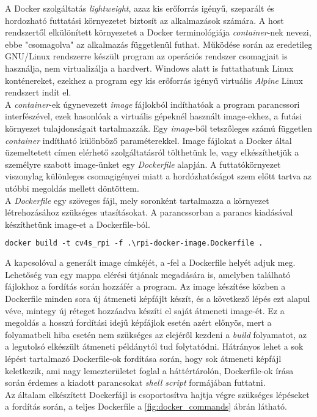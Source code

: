 A Docker szolgáltatás \emph{lightweight}, azaz kis erőforrás igényű, szeparált és hordozható futtatási környezetet biztosít az alkalmazások számára. A host rendszertől elkülönített környezetet a Docker terminológiája \emph{container}-nek nevezi, ebbe "csomagolva" az alkalmazás függetlenül futhat. Működése során az eredetileg GNU/Linux rendszerre készült program az operációs rendszer csomagjait is használja, nem virtualizálja a hardvert. Windows alatt is futtathatunk Linux konténereket, ezekhez a program egy kis erőforrás igényű virtuális \emph{Alpine} Linux rendszert indít el. 
\\
 A \emph{container}-ek úgynevezett \emph{image} fájlokból indíthatóak a program parancssori interfészével, ezek hasonlóak a virtuális gépeknél használt image-ekhez, a futási környezet tulajdonságait tartalmazzák. Egy \emph{image}-ből tetszőleges számú független \emph{container} indítható különböző paraméterekkel. Image fájlokat a Docker által üzemeltetett  címen elérhető szolgáltatásról tölthetünk le, vagy elkészíthetjük a személyre szabott image-ünket egy \emph{Dockerfile} alapján. A futtatókörnyezet viszonylag különleges csomagigényei miatt a hordózhatóságot szem előtt tartva az utóbbi megoldás mellett döntöttem.\\
A \emph{Dockerfile} egy szöveges fájl, mely soronként tartalmazza a környezet létrehozásához szükséges utasításokat. A parancssorban a  parancs kiadásával készíthetünk image-et a Dockerfile-ból.

\begin{mdframed}[backgroundcolor=gray!20]
\begin{small}
\begin{lstlisting}[language=XML]
docker build -t cv4s_rpi -f .\rpi-docker-image.Dockerfile .
\end{lstlisting}
\end{small}
\end{mdframed}

A  kapcsolóval a generált image címkéjét, a -fel a Dockerfile helyét adjuk meg. Lehetőség van egy mappa elérési útjának megadására is, amelyben található fájlokhoz a fordítás során hozzáfér a program. Az image készítése közben a Dockerfile minden sora új átmeneti képfájlt készít, és a következő lépés ezt alapul véve, mintegy új réteget hozzáadva készíti el saját átmeneti image-ét. Ez a megoldás a hosszú fordítási idejű képfájlok esetén azért előnyös, mert a folyamatbeli hiba esetén nem szükséges az elejéről kezdeni a \emph{build} folyamatot, az a legutolsó elkészült átmeneti példánytól tud folytatódni. Hátrányos lehet a sok lépést tartalmazó Dockerfile-ok fordítása során, hogy sok átmeneti képfájl keletkezik, ami nagy lemezterületet foglal a háttértárolón, Dockerfile-ok írása során érdemes a kiadott parancsokat \emph{shell script} formájában futtatni.\\
Az általam elkészített Dockerfájl is csoportosítva hajtja végre szükséges lépéseket a fordítás során, a teljes Dockerfile  a \ref{fig:docker_commands} ábrán látható.

